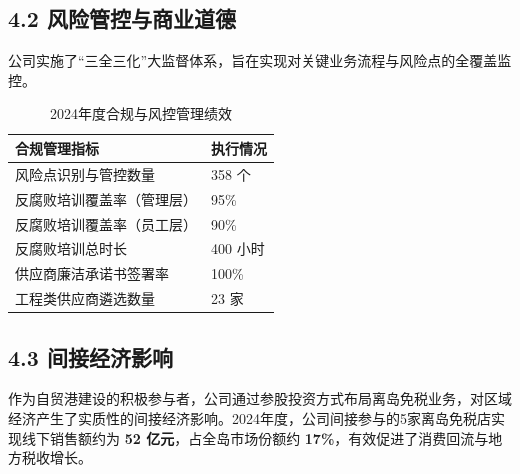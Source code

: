 \documentclass[a4paper,12pt]{article}
\begin{document}
\subsection{4.2 风险管控与商业道德}

公司实施了“三全三化”大监督体系，旨在实现对关键业务流程与风险点的全覆盖监控。

\begin{table}[H]
    \centering
    \caption{2024年度合规与风控管理绩效}
    \label{tab:gov_stats}
    \renewcommand{\arraystretch}{1.3}
    \begin{tabular}{p{9cm} p{4cm}}
        \toprule
        \textbf{合规管理指标} & \textbf{执行情况} \\
        \midrule
        风险点识别与管控数量 & 358 个 \\
        反腐败培训覆盖率（管理层） & 95\% \\
        反腐败培训覆盖率（员工层） & 90\% \\
        反腐败培训总时长 & 400 小时 \\
        供应商廉洁承诺书签署率 & 100\% \\
        工程类供应商遴选数量 & 23 家 \\
        \bottomrule
    \end{tabular}
\end{table}

\subsection{4.3 间接经济影响}

作为自贸港建设的积极参与者，公司通过参股投资方式布局离岛免税业务，对区域经济产生了实质性的间接经济影响。2024年度，公司间接参与的5家离岛免税店实现线下销售额约为 \textbf{52 亿元}，占全岛市场份额约 \textbf{17\%}，有效促进了消费回流与地方税收增长。
\end{document}
